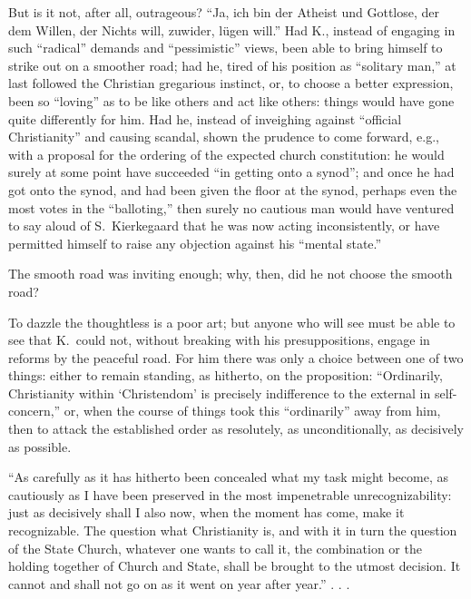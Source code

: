 \documentclass[12pt,a4paper]{article}
\newcommand{\opage}[1]{\marginnote{\footnotesize\textit{[#1]}}}
\begin{document}
But is it not, after all, outrageous? ``Ja, ich bin der
Atheist und Gottlose, der dem Willen, der Nichts will, zuwider,
lügen will.'' Had K., instead of engaging in
such ``radical'' demands and ``pessimistic'' views,
been able to bring himself to strike out on a smoother road;
had he, tired of his position as ``solitary man,'' at
last followed the Christian gregarious instinct, or, to choose
a better expression, been so ``loving'' as to be like others
and act like others: things would have gone quite
differently for him. Had he, instead of inveighing against ``official
Christianity'' and causing scandal, shown the
prudence to come forward, e.g., with a proposal for the ordering
of the expected church constitution: he would surely at some
point have succeeded ``in getting onto a
synod''; and once he had got onto the synod, and
had been given the floor at the synod, perhaps even the most
votes in the ``balloting,'' then surely no cautious
man would have ventured to say aloud of S.\ Kierkegaard
that he was now acting inconsistently, or have permitted himself to raise
any objection against his ``mental state.''

\opage{27}The smooth road was inviting enough; why, then, did
he not choose the smooth road?

To dazzle the thoughtless is a poor art; but
anyone who will see must be able to see that K.\ could not, without
breaking with his presuppositions, engage in
reforms by the peaceful road. For him there was only a choice
between one of two things: either to remain standing, as hitherto, on
the proposition: ``Ordinarily, Christianity within
`Christendom' is precisely indifference to the external in
self-concern,'' or, when the course of things took this
``ordinarily'' away from him, then to attack the established order
as resolutely, as unconditionally, as decisively
as possible.

``As carefully as it has hitherto been concealed
what my task might become, as cautiously
as I have been preserved in the most impenetrable
unrecognizability: just as decisively shall I also now, when
the moment has come, make it recognizable. The question
what Christianity is, and with it in turn the question
of the State Church, whatever one wants to call it, the combination
or the holding together of Church and State, shall be
brought to the utmost decision. It cannot and shall not
go on as it went on year after year.'' . . .
\end{document}
